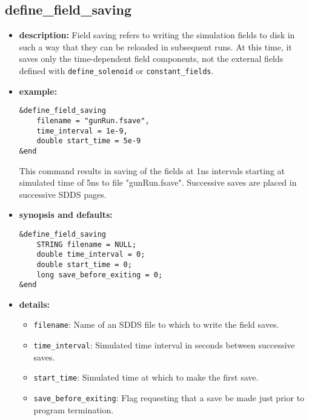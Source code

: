 %
\newpage

\subsection{define\_field\_saving}

\begin{itemize}

\item {\bf description:}
Field saving refers to writing the simulation fields to disk in 
such a way that they can be reloaded in subsequent runs.  At this
time, it saves only the time-dependent field components, not the
external fields defined with {\tt define\_solenoid} or {\tt constant\_fields}.

\item {\bf example:} 
\begin{verbatim}
&define_field_saving
    filename = "gunRun.fsave",
    time_interval = 1e-9,
    double start_time = 5e-9
&end
\end{verbatim}
This command results in saving of the fields at 1ns intervals starting
at simulated time of 5ns to file "gunRun.fsave".  Successive saves are
placed in successive SDDS pages.

\item {\bf synopsis and defaults:} 
\begin{verbatim}
&define_field_saving
    STRING filename = NULL;
    double time_interval = 0;
    double start_time = 0;
    long save_before_exiting = 0;
&end
\end{verbatim}

\item {\bf details:} 
\begin{itemize}
    \item {\tt filename}:  Name of an SDDS file to which to write the field saves.
    \item {\tt time\_interval}: Simulated time interval in seconds between successive saves.
    \item {\tt start\_time}: Simulated time at which to make the first save.
    \item {\tt save\_before\_exiting}: Flag requesting that a save be made just prior to
        program termination.
\end{itemize}

\end{itemize}
